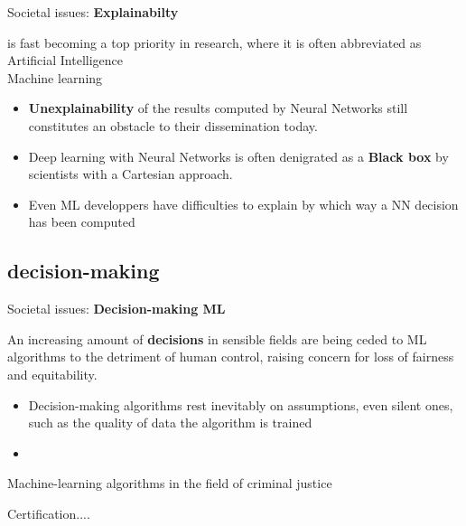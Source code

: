 \documentclass[10pt,serif,mathserif,compress,hyperref={colorlinks}]{beamer}
\begin{document}
\begin{frame}{Societal issues: {\bf Explainabilty}}

   is fast becoming a top priority in research, where it is often
  abbreviated as \\
  \hspace*{10mm}{\bf xAI} \hspace*{10mm}{\bf Explainable} Artificial Intelligence\\
  \hspace*{10mm}{\bf iML} \hspace*{10mm}{\bf Interpretable} Machine learning
  \bigskip

  \begin{tcolorbox}[title={\bf Explainability}]
    \begin{itemize}
    \item {\bf Unexplainability} of the results computed by Neural Networks still constitutes an obstacle to their dissemination today.
    \item Deep learning with Neural Networks is often denigrated as a {\bf Black box} by scientists with a Cartesian approach.
    \item Even ML developpers have difficulties to explain by which way a NN decision has been computed
    \end{itemize}
  \end{tcolorbox}   
    
  
\end{frame}

\subsection{decision-making}

\begin{frame}{Societal issues: {\bf Decision-making ML}}

  An increasing amount of {\bf decisions} in sensible fields are being ceded to ML algorithms to the detriment of
  human control, raising concern for loss of fairness and equitability.
  
  \begin{tcolorbox}[title={\bf Explainability}]
    \begin{itemize}
    \item  Decision-making algorithms rest inevitably on assumptions, even silent ones, such as the quality of data the algorithm is trained
    \item 
    \end{itemize}
  \end{tcolorbox}   
  
  Machine-learning algorithms in the field of criminal justice

  Certification....
  
\end{frame}
\end{document}
